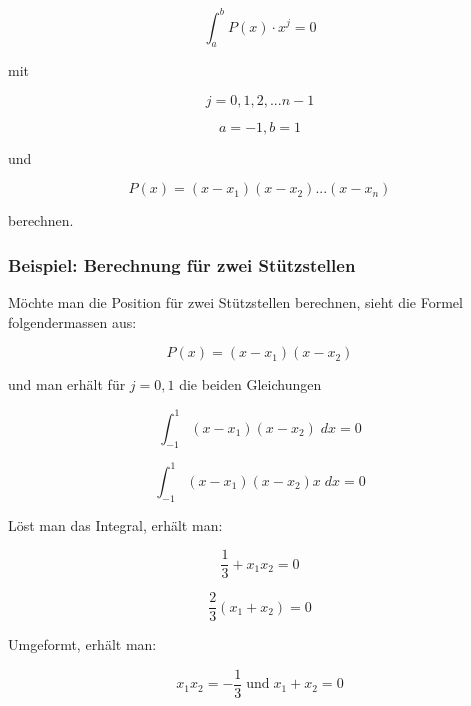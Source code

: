 \begin{equation*}
    \int_{a}^{b} P(x) \cdot x^{j} = 0
\end{equation*}

mit

\begin{equation*}
    j = 0, 1, 2, ... n - 1
\end{equation*}

\begin{equation*}
    a = -1, b = 1
\end{equation*}

und 

\begin{equation}
    P(x) = (x - x_{1})(x - x_{2}) ... (x - x_{n})
\end{equation}

berechnen.

\subsubsection{Beispiel: Berechnung für zwei Stützstellen}
Möchte man die Position für zwei Stützstellen berechnen, sieht die Formel folgendermassen aus:

\begin{equation}
    P(x) = (x - x_{1})(x - x_{2})
\end{equation}

und man erhält für $j = 0,1$ die beiden Gleichungen

\begin{equation*}
    \int_{-1}^{1}(x - x_{1})(x - x_{2}) \; dx = 0
\end{equation*}

\begin{equation*}
    \int_{-1}^{1}(x - x_{1})(x - x_{2})x \; dx = 0
\end{equation*}

Löst man das Integral, erhält man:

\begin{equation*}
    \frac{1}{3} + x_{1}x_{2} = 0
\end{equation*}

\begin{equation}
    \frac{2}{3}(x_{1}+x_{2}) = 0
\end{equation}

Umgeformt, erhält man:

\begin{equation}
    x_{1}x_{2} = -\frac{1}{3}
    \;
    \text{und}
    \;
    x_{1}+x_{2} = 0
\end{equation}

